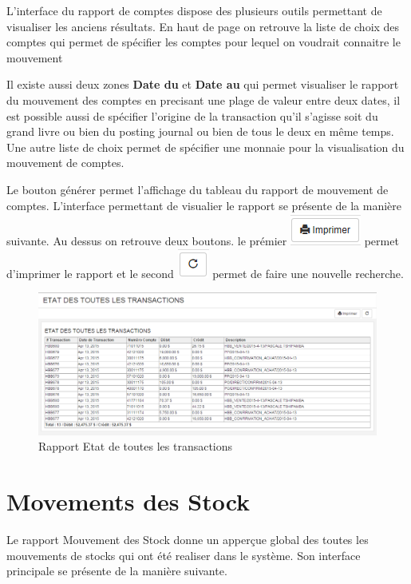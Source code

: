 \documentclass[12pt,a4paper]{report}
\begin{document}
L'interface du rapport de comptes dispose des plusieurs outils permettant de visualiser les anciens résultats. En haut de page on retrouve la liste de choix des comptes qui permet de spécifier les comptes pour lequel on voudrait connaitre le mouvement

Il existe aussi deux zones \textbf{Date du} et \textbf{Date au} qui permet visualiser le rapport du mouvement des comptes en precisant une plage de valeur entre deux dates, il est possible aussi de spécifier l'origine de la transaction qu'il s'agisse soit du grand livre ou bien du posting journal ou bien de tous le deux en même temps. Une autre liste de choix permet de spécifier une monnaie pour la visualisation du mouvement de comptes.

\newpage
Le bouton générer permet l'affichage du tableau du rapport de mouvement de comptes. L'interface permettant de visualier le rapport se présente de la manière suivante. Au dessus on retrouve deux boutons. le prémier 
\includegraphics[scale=0.7]{pic/Print.png} permet d'imprimer le rapport et le second \includegraphics[scale=0.7]{pic/refresh.png} permet de faire une nouvelle recherche.

\begin{figure}[h]
\begin{center}
\includegraphics[width=14cm]{pic/EtatAllTransaction.png}
\end{center}
\caption{Rapport Etat de toutes les transactions}
\label{Rapport Etat de toutes les transactions}
\end{figure}

\newpage
\section{Movements des Stock}
Le rapport Mouvement des Stock donne un apperçue global des toutes les mouvements de stocks qui ont été realiser dans le système. Son interface principale se présente de la manière suivante. 
\end{document}
